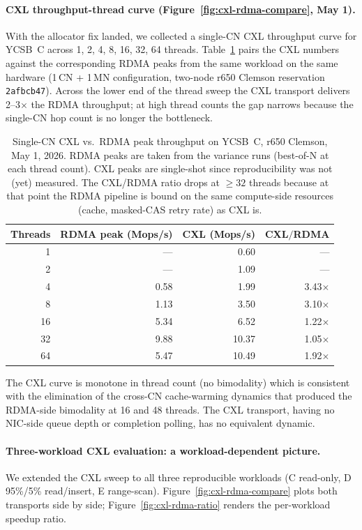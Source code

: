 \documentclass[11pt,a4paper]{article}
\begin{document}
\paragraph{CXL throughput-thread curve (Figure~\ref{fig:cxl-rdma-compare}, May 1).} With the allocator fix landed, we collected a single-CN CXL throughput curve for YCSB~C across 1, 2, 4, 8, 16, 32, 64 threads. Table~\ref{tab:cxl-vs-rdma} pairs the CXL numbers against the corresponding RDMA peaks from the same workload on the same hardware (1\,CN + 1\,MN configuration, two-node r650 Clemson reservation \texttt{2afbcb47}). Across the lower end of the thread sweep the CXL transport delivers 2--3$\times$ the RDMA throughput; at high thread counts the gap narrows because the single-CN hop count is no longer the bottleneck.

\begin{table}[H]
\centering
\small
\caption{Single-CN CXL vs.\ RDMA peak throughput on YCSB~C, r650 Clemson, May 1, 2026. RDMA peaks are taken from the variance runs (best-of-N at each thread count). CXL peaks are single-shot since reproducibility was not (yet) measured. The CXL/RDMA ratio drops at $\geq 32$ threads because at that point the RDMA pipeline is bound on the same compute-side resources (cache, masked-CAS retry rate) as CXL is.}
\label{tab:cxl-vs-rdma}
\begin{tabular}{@{}rrrr@{}}
\toprule
Threads & RDMA peak (Mops/s) & CXL (Mops/s) & CXL$/$RDMA \\
\midrule
1   & ---     & 0.60  & ---   \\
2   & ---     & 1.09  & ---   \\
4   & 0.58    & 1.99  & 3.43$\times$ \\
8   & 1.13    & 3.50  & 3.10$\times$ \\
16  & 5.34    & 6.52  & 1.22$\times$ \\
32  & 9.88    & 10.37 & 1.05$\times$ \\
64  & 5.47    & 10.49 & 1.92$\times$ \\
\bottomrule
\end{tabular}
\end{table}

The CXL curve is monotone in thread count (no bimodality) which is consistent with the elimination of the cross-CN cache-warming dynamics that produced the RDMA-side bimodality at 16 and 48 threads. The CXL transport, having no NIC-side queue depth or completion polling, has no equivalent dynamic.

\paragraph{Three-workload CXL evaluation: a workload-dependent picture.} We extended the CXL sweep to all three reproducible workloads (C read-only, D 95\%/5\% read/insert, E range-scan). Figure~\ref{fig:cxl-rdma-compare} plots both transports side by side; Figure~\ref{fig:cxl-rdma-ratio} renders the per-workload speedup ratio.
\end{document}
